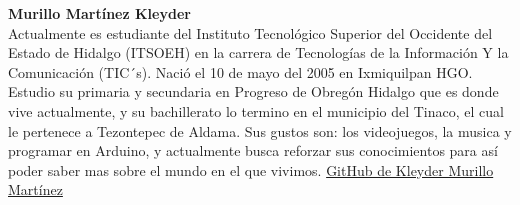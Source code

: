 \documentclass[conference]{IEEEtran}
\begin{document}
\textbf{Murillo Martínez Kleyder} \\
Actualmente es estudiante del Instituto Tecnológico Superior del Occidente del Estado de Hidalgo (ITSOEH) en la carrera de Tecnologías de la Información Y la Comunicación (TIC´s). Nació el 10 de mayo del 2005 en Ixmiquilpan HGO. Estudio su primaria y secundaria en Progreso de Obregón Hidalgo que es donde vive actualmente, y su bachillerato lo termino en el municipio del Tinaco, el cual le pertenece a Tezontepec de Aldama.
Sus gustos son: los videojuegos, la musica y programar en Arduino, y actualmente busca reforzar sus conocimientos para así poder saber mas sobre el mundo en el que vivimos.
\href{https://github.com/KleyderMurillo}{GitHub de Kleyder Murillo Martínez}
\end{document}

